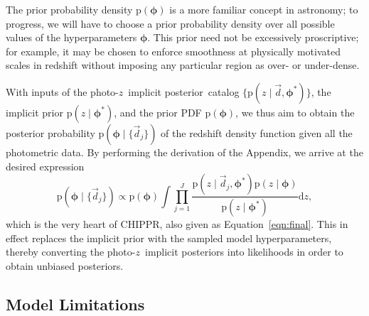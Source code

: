 \documentclass[iop]{emulateapj}
\newcommand{\Eq}[1]{Equation~\ref{#1}}
\newcommand{\project}[1]{\textsc{#1}}
\newcommand{\Chippr}{\project{CHIPPR}}%
\newcommand{\data}{\ensuremath{\vec{d}}}%
\newcommand{\pr}[1]{\ensuremath{\mathrm{p}(#1)}}%
\newcommand{\gvn}{\mid}%
\newcommand{\integral}[2]{\ensuremath{\int #1 \mathrm{d} #2}}
\newcommand{\pz}{photo-$z$}
\newcommand{\pzip}{\pz\ implicit posterior}
\newcommand{\bvec}[1]{\ensuremath{\boldsymbol{#1}}}%
\newcommand{\ndphi}{\bvec{\phi}}
\begin{document}

The prior probability density $\pr{\ndphi}$ is a more familiar concept in astronomy; to progress, we will have to choose a prior probability density over all possible values of the hyperparameters $\ndphi$.
This prior need not be excessively proscriptive; for example, it may be chosen to enforce smoothness at physically motivated scales in redshift without imposing any particular region as over- or under-dense.

With inputs of the \pzip\ catalog $\{\pr{z \gvn \data, \ndphi^{*}}\}$, the implicit prior $\pr{z \gvn \ndphi^{*}}$, and the prior PDF $\pr{\ndphi}$, we thus aim to obtain the posterior probability $\pr{\ndphi \gvn \{\data_{j}\}}$ of the redshift density function given all the photometric data.
By performing the derivation of the Appendix, we arrive at the desired expression
\begin{equation}
\label{eqn:fullpost}
\pr{\ndphi \gvn \{\data_{j}\}} \propto \pr{\ndphi} \integral{\prod_{j=1}^{J} \frac{\pr{z \gvn \data_{j}, \ndphi^{*}} \pr{z \gvn \ndphi}}{\pr{z \gvn \ndphi^{*}}}}{z},
\end{equation}
which is the very heart of \Chippr, also given as \Eq{eqn:final}.
This in effect replaces the implicit prior with the sampled model hyperparameters, thereby converting the \pzip s into likelihoods in order to obtain unbiased posteriors.

\subsection{Model Limitations}
\label{sec:limitations}
\end{document}
